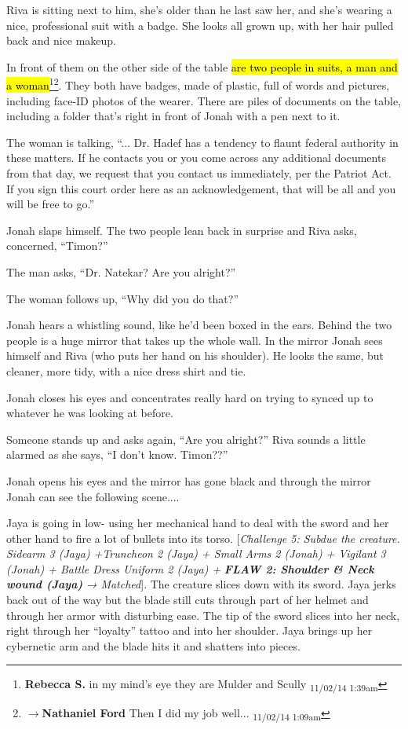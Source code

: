 Riva is sitting next to him, she's older than he last saw her, and she's wearing a nice, professional suit with a badge.  She looks all grown up, with her hair pulled back and nice makeup.

In front of them on the other side of the table \hl{are two people in suits, a man and a woman}\footnote{\textbf{Rebecca S. }in my mind's eye they are Mulder and Scully \textsubscript{11/02/14 1:39am}}\footnote{$\rightarrow$\textbf{Nathaniel Ford }Then I did my job well... \textsubscript{11/02/14 1:09am}}.  They both have badges, made of plastic, full of words and pictures, including face-ID photos of the wearer. There are piles of documents on the table, including a folder that's right in front of Jonah with a pen next to it.  

The woman is talking, ``... Dr. Hadef has a tendency to flaunt federal authority in these matters.  If he contacts you or you come across any additional documents from that day, we request that you contact us immediately, per the Patriot Act.  If you sign this court order here as an acknowledgement, that will be all and you will be free to go.''

Jonah slaps himself.  The two people lean back in surprise and Riva asks, concerned, ``Timon?''

The man asks, ``Dr. Natekar?  Are you alright?''

The woman follows up, ``Why did you do that?''

Jonah hears a whistling sound, like he'd been boxed in the ears.  Behind the two people is a huge mirror that takes up the whole wall.  In the mirror Jonah sees himself and Riva (who puts her hand on his shoulder). He looks the same, but cleaner, more tidy, with a nice dress shirt and tie.

Jonah closes his eyes and concentrates really hard on trying to synced up to whatever he was looking at before.

Someone stands up and asks again, ``Are you alright?''  Riva sounds a little alarmed as she says, ``I don't know.  Timon??''

Jonah opens his eyes and the mirror has gone black and through the mirror Jonah can see the following scene....



Jaya is going in low- using her mechanical hand to deal with the sword and her other hand to fire a lot of bullets into its torso.  {[}\textit{Challenge 5: Subdue the creature.  Sidearm 3 (Jaya) +Truncheon 2 (Jaya) + Small Arms 2 (Jonah) + Vigilant 3 (Jonah) + Battle Dress Uniform 2 (Jaya) + }\textit{\textbf{ {\color[RGB]{255,0,0}FLAW 2: Shoulder \& Neck wound (Jaya)} }}\textit{ → Matched}{]}.  The creature slices down with its sword.  Jaya jerks back out of the way but the blade still cuts through part of her helmet and through her armor with disturbing ease.  The tip of the sword slices into her neck, right through her ``loyalty'' tattoo and into her shoulder.  Jaya brings up her cybernetic arm and the blade hits it and shatters into pieces.  



